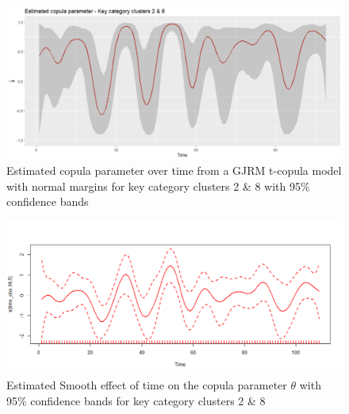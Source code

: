 \begin{figure}[H]
\centering
  \includegraphics[width=0.95\linewidth]{figures/estimated_theta_kcc_28.png}
  \caption{Estimated copula parameter over time from a \ac{GJRM} t-copula model with normal margins for key category clusters 2 \& 8 with 95\% confidence bands}
  \label{fig:estimated_theta_kcc_28}
\end{figure}




\begin{figure}[H]
\centering
  \includegraphics[width=0.95\linewidth]{figures/time_effect_on_theta_28.png}
  \caption{Estimated Smooth effect of time on the copula parameter $\theta$ with 95\% confidence bands for key category clusters 2 \& 8}
  \label{fig:time_effect_on_theta_28}
\end{figure}











